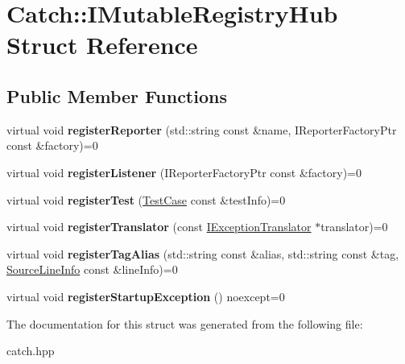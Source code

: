 \hypertarget{structCatch_1_1IMutableRegistryHub}{}\section{Catch\+:\+:I\+Mutable\+Registry\+Hub Struct Reference}
\label{structCatch_1_1IMutableRegistryHub}
\subsection*{Public Member Functions}
\begin{DoxyCompactItemize}
\item 
virtual void {\bfseries register\+Reporter} (std\+::string const \&name, I\+Reporter\+Factory\+Ptr const \&factory)=0\hypertarget{structCatch_1_1IMutableRegistryHub_a1c0ac202ac31ee9f88e8ff5cbac4b243}{}\label{structCatch_1_1IMutableRegistryHub_a1c0ac202ac31ee9f88e8ff5cbac4b243}

\item 
virtual void {\bfseries register\+Listener} (I\+Reporter\+Factory\+Ptr const \&factory)=0\hypertarget{structCatch_1_1IMutableRegistryHub_abd892a133f85581fd00ee75bb379ca56}{}\label{structCatch_1_1IMutableRegistryHub_abd892a133f85581fd00ee75bb379ca56}

\item 
virtual void {\bfseries register\+Test} (\hyperlink{classCatch_1_1TestCase}{Test\+Case} const \&test\+Info)=0\hypertarget{structCatch_1_1IMutableRegistryHub_a11b85c6744d88c9f83fe16ad4a8dd451}{}\label{structCatch_1_1IMutableRegistryHub_a11b85c6744d88c9f83fe16ad4a8dd451}

\item 
virtual void {\bfseries register\+Translator} (const \hyperlink{structCatch_1_1IExceptionTranslator}{I\+Exception\+Translator} $\ast$translator)=0\hypertarget{structCatch_1_1IMutableRegistryHub_ae6825365102693cf7707db022a2c2b49}{}\label{structCatch_1_1IMutableRegistryHub_ae6825365102693cf7707db022a2c2b49}

\item 
virtual void {\bfseries register\+Tag\+Alias} (std\+::string const \&alias, std\+::string const \&tag, \hyperlink{structCatch_1_1SourceLineInfo}{Source\+Line\+Info} const \&line\+Info)=0\hypertarget{structCatch_1_1IMutableRegistryHub_abf2e386b6f94f615719ada711adbf822}{}\label{structCatch_1_1IMutableRegistryHub_abf2e386b6f94f615719ada711adbf822}

\item 
virtual void {\bfseries register\+Startup\+Exception} () noexcept=0\hypertarget{structCatch_1_1IMutableRegistryHub_a72a7d5386851ac3200f8da794a009c86}{}\label{structCatch_1_1IMutableRegistryHub_a72a7d5386851ac3200f8da794a009c86}

\end{DoxyCompactItemize}


The documentation for this struct was generated from the following file\+:\begin{DoxyCompactItemize}
\item 
catch.\+hpp\end{DoxyCompactItemize}

